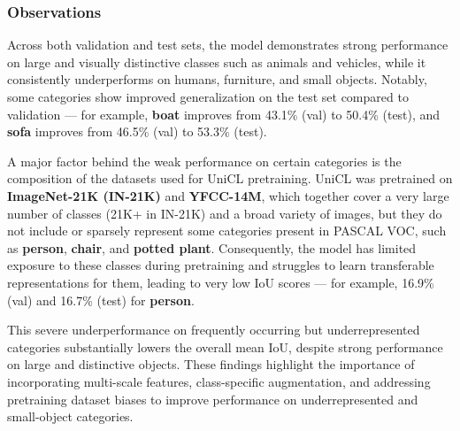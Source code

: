 \subsubsection{Observations}

Across both validation and test sets, the model demonstrates strong performance on large and visually distinctive classes such as animals and vehicles, while it consistently underperforms on humans, furniture, and small objects. Notably, some categories show improved generalization on the test set compared to validation — for example, \textbf{boat} improves from 43.1\% (val) to 50.4\% (test), and \textbf{sofa} improves from 46.5\% (val) to 53.3\% (test). 

A major factor behind the weak performance on certain categories is the composition of the datasets used for UniCL pretraining. UniCL was pretrained on \textbf{ImageNet-21K (IN-21K)} and \textbf{YFCC-14M}, which together cover a very large number of classes (21K+ in IN-21K) and a broad variety of images, but they do not include or sparsely represent some categories present in PASCAL VOC, such as \textbf{person}, \textbf{chair}, and \textbf{potted plant}. Consequently, the model has limited exposure to these classes during pretraining and struggles to learn transferable representations for them, leading to very low IoU scores — for example, 16.9\% (val) and 16.7\% (test) for \textbf{person}. 

This severe underperformance on frequently occurring but underrepresented categories substantially lowers the overall mean IoU, despite strong performance on large and distinctive objects. These findings highlight the importance of incorporating multi-scale features, class-specific augmentation, and addressing pretraining dataset biases to improve performance on underrepresented and small-object categories.



